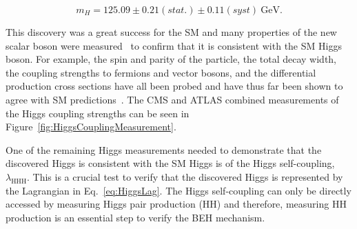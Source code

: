 \begin{equation}
m_{H}=125.09\pm 0.21(stat.)\pm 0.11(syst) ~\mathrm{GeV}.
\end{equation}

\noindent
This discovery was a great success for the SM and many properties of the new scalar boson were measured~\cite{ATLASHiggsProperties, CMSHiggsProperties} to confirm that it is consistent with the SM Higgs boson. For example, the spin and parity of the particle, the total decay width, the coupling strengths to fermions and vector bosons, and the differential production cross sections have all been probed and have thus far been shown to agree with SM predictions~\cite{HiggsProperties}. The CMS and ATLAS combined measurements of the Higgs coupling strengths can be seen in Figure~\ref{fig:HiggsCouplingMeasurement}. 

One of the remaining Higgs measurements needed to demonstrate that the discovered Higgs is consistent with the SM Higgs is of the Higgs self-coupling, $\lambda_{\mathrm{HHH}}$. This is a crucial test to verify that the discovered Higgs is represented by the Lagrangian in Eq.~\ref{eq:HiggsLag}. The Higgs self-coupling can only be directly accessed by measuring Higgs pair production (HH) and therefore, measuring HH production is an essential step to verify the BEH mechanism.




